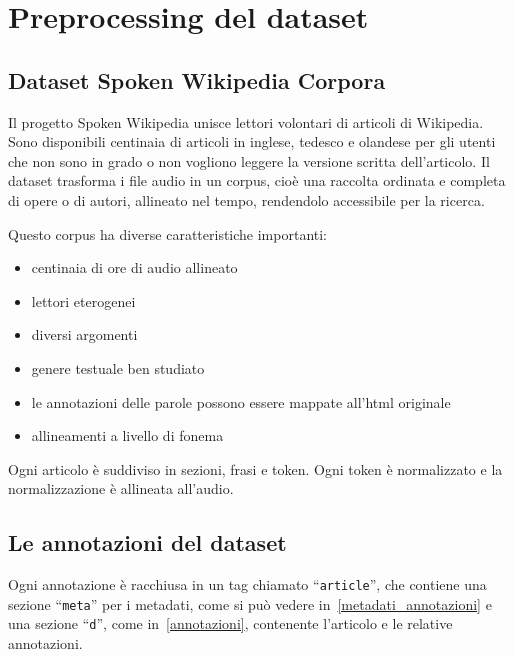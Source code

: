 \documentclass[12pt,a4paper,titlepage]{article}
\begin{document}
\clearpage

\section{Preprocessing del dataset}
\label{sec:preprocessing_dataset}
\subsection{Dataset Spoken Wikipedia Corpora}
\label{subsec:spoken_wikipedia_corpora}
Il progetto Spoken Wikipedia unisce lettori volontari di articoli di Wikipedia. Sono disponibili centinaia di articoli in inglese, tedesco e olandese per gli utenti che non sono in grado o non vogliono leggere la versione scritta dell'articolo. Il dataset trasforma i file audio in un corpus, cioè una raccolta ordinata e completa di opere o di autori, allineato nel tempo, rendendolo accessibile per la ricerca.\cite{minining_spoken_wikipedia}

Questo corpus ha diverse caratteristiche importanti:
\begin{itemize}
	\item centinaia di ore di audio allineato
	\item lettori eterogenei
	\item diversi argomenti
	\item genere testuale ben studiato
	\item le annotazioni delle parole possono essere mappate all'html originale
	\item allineamenti a livello di fonema
\end{itemize}

Ogni articolo è suddiviso in sezioni, frasi e token. Ogni token è normalizzato e la normalizzazione è allineata all'audio.

\subsection{Le annotazioni del dataset}
\label{subsec:annotazioni}
Ogni annotazione è racchiusa in un tag chiamato ``\texttt{article}'', che contiene una sezione ``\texttt{meta}'' per i metadati, come si può vedere in~\ref{metadati_annotazioni} e una sezione ``\texttt{d}'', come in~\ref{annotazioni}, contenente l'articolo e le relative annotazioni.
\end{document}
